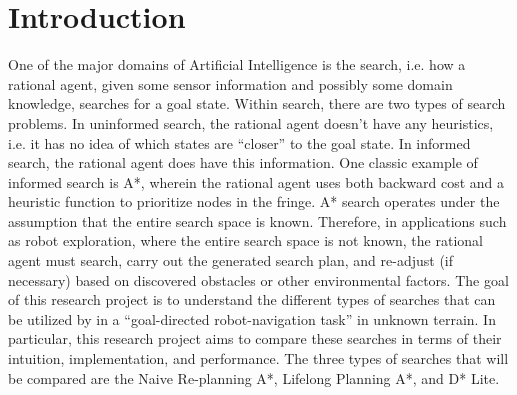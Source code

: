 
\section{Introduction}
	One of the major domains of Artificial Intelligence is the search, i.e. how a rational agent, given some sensor information and possibly some domain knowledge, searches for a goal state. Within search, there are two types of search problems. In uninformed search, the rational agent doesn't have any heuristics, i.e. it has no idea of which states are ``closer'' to the goal state. In informed search, the rational agent does have this information. 
	One classic example of informed search is A*, wherein the rational agent uses both backward cost and a heuristic function to prioritize nodes in the fringe. A* search operates under the assumption that the entire search space is known. Therefore, in applications such as robot exploration, where the entire search space is not known, the rational agent must search, carry out the generated search plan, and re-adjust (if necessary) based on discovered obstacles or other environmental factors. 
	The goal of this research project is to understand the different types of searches that can be utilized by in a ``goal-directed robot-navigation task'' in unknown terrain. In particular, this research project aims to compare these searches in terms of their intuition, implementation, and performance. The three types of searches that will be compared are the Naive Re-planning A*, Lifelong Planning A*, and D* Lite.